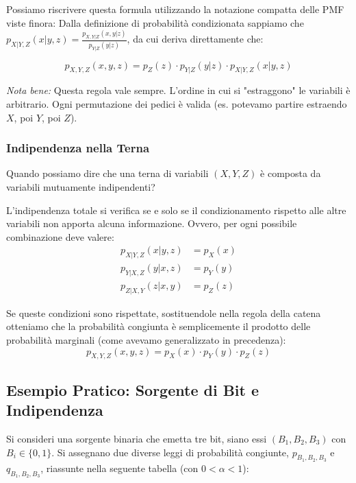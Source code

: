 Possiamo riscrivere questa formula utilizzando la notazione compatta delle PMF viste finora:
Dalla definizione di probabilità condizionata sappiamo che $p_{X|Y,Z}(x|y,z) = \frac{p_{X,Y|Z}(x,y|z)}{p_{Y|Z}(y|z)}$, da cui deriva direttamente che:

\begin{equation}
\boxed{p_{X,Y,Z}(x,y,z) = p_Z(z) \cdot p_{Y|Z}(y|z) \cdot p_{X|Y,Z}(x|y,z)}
\end{equation}

\textit{Nota bene:} Questa regola vale sempre. L'ordine in cui si "estraggono" le variabili è arbitrario. Ogni permutazione dei pedici è valida (es. potevamo partire estraendo $X$, poi $Y$, poi $Z$).

\subsubsection{Indipendenza nella Terna}

Quando possiamo dire che una terna di variabili $(X, Y, Z)$ è composta da variabili mutuamente indipendenti?

L'indipendenza totale si verifica se e solo se il condizionamento rispetto alle altre variabili non apporta alcuna informazione. Ovvero, per ogni possibile combinazione deve valere:
\begin{align}
    p_{X|Y,Z}(x|y,z) &= p_X(x) \\
    p_{Y|X,Z}(y|x,z) &= p_Y(y) \\
    p_{Z|X,Y}(z|x,y) &= p_Z(z)
\end{align}

Se queste condizioni sono rispettate, sostituendole nella regola della catena otteniamo che la probabilità congiunta è semplicemente il prodotto delle probabilità marginali (come avevamo generalizzato in precedenza):
\[
p_{X,Y,Z}(x,y,z) = p_X(x) \cdot p_Y(y) \cdot p_Z(z)
\]

\subsection{Esempio Pratico: Sorgente di Bit e Indipendenza}

Si consideri una sorgente binaria che emetta tre bit, siano essi $(B_1, B_2, B_3)$ con $B_i \in \{0,1\}$. 
Si assegnano due diverse leggi di probabilità congiunte, $p_{B_1, B_2, B_3}$ e $q_{B_1, B_2, B_3}$, riassunte nella seguente tabella (con $0 < \alpha < 1$):

